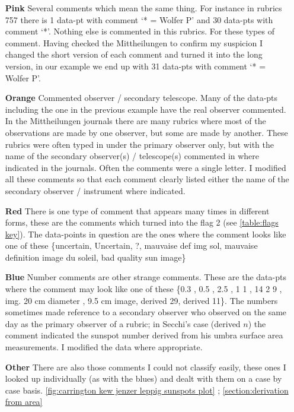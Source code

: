 \documentclass[12pt]{article}
\begin{document}
\begin{itemize}
    \item[\textbf{Pink}] Several comments which mean the same thing. For instance in rubrics 757 there is 1 data-pt with comment `* = Wolfer P' and 30 data-pts with comment `*'. Nothing else is commented in this rubrics. For these types of comment. Having checked the Mittheilungen to confirm my suspicion I changed the short version of each comment and turned it into the long version, in our example we end up with 31 data-pts with comment `* = Wolfer P'.
    \item[\textbf{Orange}] Commented observer / secondary telescope. Many of the data-pts including the one in the previous example have the real observer commented. In the Mittheilungen journals there are many rubrics where most of the observations are made by one observer, but some are made by another. These rubrics were often typed in under the primary observer only, but with the name of the secondary observer(s) / telescope(s) commented in where indicated in the journals. Often the comments were a single letter. I modified all these comments so that each comment clearly listed either the name of the secondary observer / instrument where indicated.
    \item[\textbf{Red}] There is one type of comment that appears many times in different forms, these are the comments which turned into the flag 2 (see \ref{table:flags key}). The data-points in question are the ones where the comment looks like one of these \{uncertain, Uncertain, ?,  mauvaise def img sol, mauvaise definition image du soleil, bad quality sun image\}
    \item[\textbf{Blue}] Number comments are other strange comments. These are the data-pts where the comment may look like one of these \{0.3 , 0.5 , 2.5 , 1 1 , 14 2 9 , img. 20 cm diameter , 9.5 cm image, derived 29, derived 11\}. The numbers sometimes made reference to a secondary observer who observed on the same day as the primary observer of a rubric; in Secchi's case (derived $n$) the comment indicated the sunspot number derived from his umbra surface area measurements. I modified the data where appropriate.
    \item[\textbf{Other}] There are also those comments I could not classify easily, these ones I looked up individually (as with the blues) and dealt with them on a case by case basis. \ref{fig:carrington kew jenzer leppig sunspots plot} ; \ref{section:derivation from area}
\end{itemize}
\end{document}
